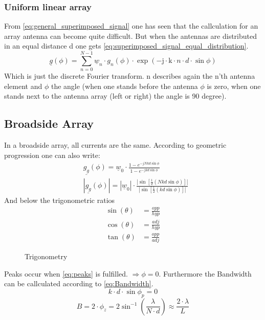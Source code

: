 \subsubsection{Uniform linear array}
From \autoref{eq:general_superimposed_signal} one has seen that the callculation for an array antenna can become quite difficult. But when the antennas are distributed in an equal distance d one gets \autoref{eq:superimposed_signal_equal_distribution}.
\begin{equation}\label{eq:superimposed_signal_equal_distribution}
\underline{g}(\phi)=\sum_{n=0}^{N-1} \underline{w}_n \cdot g_n(\phi) \cdot \exp (-\mathrm{j} \cdot \mathrm{k} \cdot n \cdot d \cdot \sin \phi)
\end{equation}
Which is just the discrete Fourier transform. n describes again the n'th antenna element and $\phi$ the angle (when one stands before the antenna $\phi$ is zero, when one stands next to the antenna array (left or right) the angle is 90 degree).
\subsection{Broadside Array}
In a broadside array, all currents are the same. According to geometric progression one can also write:
\begin{equation}
\begin{aligned}
&\underline{g_g}(\phi)=\underline{w}_0 \cdot \frac{1-e^{-j N k d \sin \phi}}{1-e^{-j k d \sin \phi}} \\
&\left|\underline{g_g}(\phi)\right|=\left|\underline{w}_0\right| \cdot \frac{\left|\sin \left[\frac{1}{2}(N k d \sin \phi)\right]\right|}{\left|\sin \left[\frac{1}{2}(k d \sin \phi)\right]\right|}
\end{aligned}
\end{equation}
And below the trigonometric ratios
\begin{equation}
\begin{aligned}
\sin (\theta) &=\frac{o p p}{h y p} \\
\cos (\theta) &=\frac{a d j}{h y p} \\
\tan (\theta) &=\frac{o p p}{a d j}
\end{aligned}
\end{equation}
\begin{figure}[ht]
  \centering
  \caption{Trigonometry}
  \label{fig:trig}
\end{figure}
Peaks occur when \autoref{eq:peaks} is fulfilled. $\Rightarrow \phi=0$. Furthermore the Bandwidth can be callculated according to \autoref{eq:Bandwidth}.
\begin{equation}\label{eq:peaks}
k \cdot d \cdot \sin \phi_p=0
\end{equation}
\begin{equation}\label{eq:Bandwidth}
B=2 \cdot \phi_z=2 \sin ^{-1}\left(\frac{\lambda}{N \cdot d}\right) \approx \frac{2 \cdot \lambda}{L}
\end{equation}
